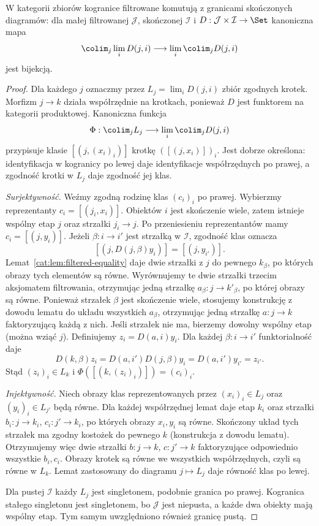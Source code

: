 \begin{twierdzenie}\label{cat:thm:filtered-finite}
W kategorii zbiorów kogranice filtrowane komutują z granicami skończonych diagramów: dla małej filtrowanej $\mathcal J$, skończonej $\mathcal I$ i $D:\mathcal J\times\mathcal I\to\Set$ kanoniczna mapa
\[
\colim_j\lim_i D(j,i)\longrightarrow
\lim_i\colim_j D(j,i)
\]
jest bijekcją.
\end{twierdzenie}
\begin{proof}
Dla każdego $j$ oznaczmy przez $L_j=\lim_iD(j,i)$ zbiór zgodnych krotek. Morfizm $j\to k$ działa współrzędnie na krotkach, ponieważ $D$ jest funktorem na kategorii produktowej. Kanoniczna funkcja
\[
\Phi:\colim_j L_j\longrightarrow\lim_i\colim_jD(j,i)
\]
przypisuje klasie $[(j,(x_i)_i)]$ krotkę $([(j,x_i)])_i$. Jest dobrze określona: identyfikacja w kogranicy po lewej daje identyfikacje współrzędnych po prawej, a zgodność krotki w $L_j$ daje zgodność jej klas.

\emph{Surjektywność.} Weźmy zgodną rodzinę klas $(c_i)_i$ po prawej. Wybierzmy reprezentanty $c_i=[(j_i,x_i)]$. Obiektów $i$ jest skończenie wiele, zatem istnieje wspólny etap $j$ oraz strzałki $j_i\to j$. Po przeniesieniu reprezentantów mamy $c_i=[(j,y_i)]$. Jeżeli $\beta:i\to i'$ jest strzałką w $\mathcal I$, zgodność klas oznacza
\[
[(j,D(j,\beta)y_i)]=[(j,y_{i'})].
\]
Lemat~\ref{cat:lem:filtered-equality} daje dwie strzałki z $j$ do pewnego $k_\beta$, po których obrazy tych elementów są równe. Wyrównujemy te dwie strzałki trzecim aksjomatem filtrowania, otrzymując jedną strzałkę $a_\beta:j\to k'_\beta$, po której obrazy są równe. Ponieważ strzałek $\beta$ jest skończenie wiele, stosujemy konstrukcję z dowodu lematu do układu wszystkich $a_\beta$, otrzymując jedną strzałkę $a:j\to k$ faktoryzującą każdą z nich. Jeśli strzałek nie ma, bierzemy dowolny wspólny etap (można wziąć $j$). Definiujemy $z_i=D(a,i)y_i$. Dla każdej $\beta:i\to i'$ funktorialność daje
\[
D(k,\beta)z_i=D(a,i')D(j,\beta)y_i=D(a,i')y_{i'}=z_{i'}.
\]
Stąd $(z_i)_i\in L_k$ i $\Phi([(k,(z_i)_i)])=(c_i)_i$.

\emph{Injektywność.} Niech obrazy klas reprezentowanych przez $(x_i)_i\in L_j$ oraz $(y_i)_i\in L_{j'}$ będą równe. Dla każdej współrzędnej lemat daje etap $k_i$ oraz strzałki $b_i:j\to k_i$, $c_i:j'\to k_i$, po których obrazy $x_i,y_i$ są równe. Skończony układ tych strzałek ma zgodny kostożek do pewnego $k$ (konstrukcja z dowodu lematu). Otrzymujemy więc dwie strzałki $b:j\to k$, $c:j'\to k$ faktoryzujące odpowiednio wszystkie $b_i,c_i$. Obrazy krotek są równe we wszystkich współrzędnych, czyli są równe w $L_k$. Lemat zastosowany do diagramu $j\mapsto L_j$ daje równość klas po lewej.

Dla pustej $\mathcal I$ każdy $L_j$ jest singletonem, podobnie granica po prawej. Kogranica stałego singletonu jest singletonem, bo $\mathcal J$ jest niepusta, a każde dwa obiekty mają wspólny etap. Tym samym uwzględniono również granicę pustą.
\end{proof}


